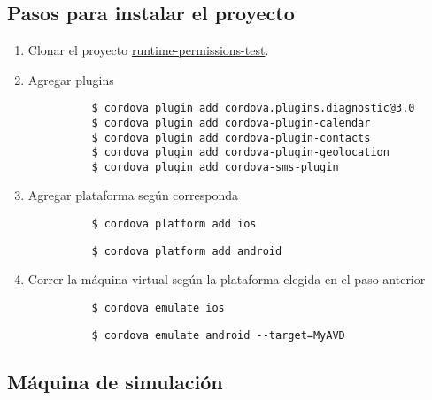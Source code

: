 \chapter{}
\section{Pasos para instalar el proyecto}
\begin{enumerate}
    \item Clonar el proyecto \href{https://github.com/rgaluppo/runtime_permissions_test}{runtime-permissions-test}.
    \item Agregar plugins
        \begin{lstlisting}
          $ cordova plugin add cordova.plugins.diagnostic@3.0
          $ cordova plugin add cordova-plugin-calendar
          $ cordova plugin add cordova-plugin-contacts
          $ cordova plugin add cordova-plugin-geolocation
          $ cordova plugin add cordova-sms-plugin
        \end{lstlisting}
    \item Agregar plataforma seg\'un corresponda
        \begin{lstlisting}
          $ cordova platform add ios
        \end{lstlisting}
                \begin{lstlisting}
          $ cordova platform add android
        \end{lstlisting}
    \item Correr la m\'aquina virtual seg\'un la plataforma elegida en el paso anterior
        \begin{lstlisting}
          $ cordova emulate ios
        \end{lstlisting}
                \begin{lstlisting}
          $ cordova emulate android --target=MyAVD
        \end{lstlisting}
\end{enumerate}
\section{M\'aquina de simulaci\'on}
